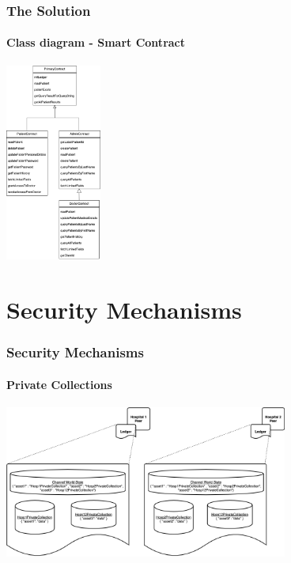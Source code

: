 \documentclass[english,hangout]{beamer}
\begin{document}
\begin{frame}[fragile]
 \frametitle{The Solution}
 \framesubtitle{Class diagram - Smart Contract}
    \begin{center}
        \vspace{-1.2em}
            \includegraphics[width=8cm\textwidth, height=6.5cm]{smartContractHierarchy.png}
        \end{center}
        \vspace{-3mm}
\end{frame}
\section{Security Mechanisms}



\begin{frame}[fragile]
 \frametitle{Security Mechanisms}
 \framesubtitle{Private Collections}
    \begin{center}
        \vspace{-1.2em}
            \includegraphics[height=5cm]{PrivateChannel.png}
        \end{center}
        \vspace{-3mm}
\end{frame}
\end{document}
